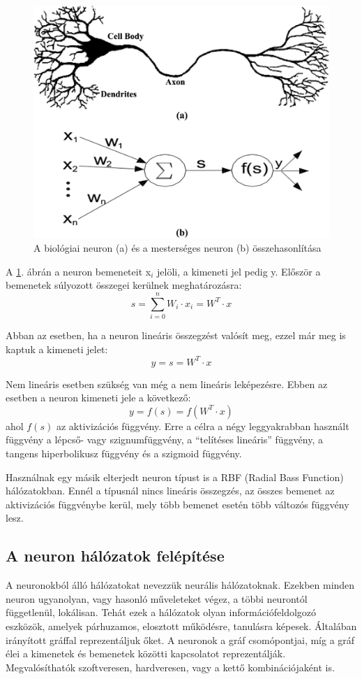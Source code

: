 \documentclass[a4paper]{article}
\begin{document}
\begin{figure}
  \centering
  \includegraphics[scale=0.6]{artifical_neuron}
  \caption{A biológiai neuron (a) és a mesterséges neuron (b) összehasonlítása}
  \label{artifical_neuron}
\end{figure}

A \ref{artifical_neuron}. ábrán a neuron bemeneteit x${_i}$ jelöli, a kimeneti jel pedig y. Először a bemenetek súlyozott összegei kerülnek meghatározásra: $${s=\sum_{i=0}^{n} W_i \cdot x_i = W^T \cdot x}$$

Abban az esetben, ha a neuron lineáris összegzést valósít meg, ezzel már meg is kaptuk a kimeneti jelet:$${y = s = W^T \cdot x}$$

Nem lineáris esetben szükség van még a nem lineáris leképezésre. Ebben az esetben a neuron kimeneti jele a következő:$${y = f(s) = f(W^T \cdot x)}$$ ahol ${f(s)}$ az aktivizációs függvény. Erre a célra a négy leggyakrabban használt függvény a lépcső- vagy szignumfüggvény, a ``telítéses lineáris'' függvény, a tangens hiperbolikusz függvény és a szigmoid függvény.

Használnak egy másik elterjedt neuron típust is a RBF (Radial Bass Function) hálózatokban. Ennél a típusnál nincs lineáris összegzés,  az összes bemenet az aktivizációs függvénybe kerül, mely több bemenet esetén több változós függvény lesz.

\subsection{A neuron hálózatok felépítése}
A neuronokból álló hálózatokat nevezzük neurális hálózatoknak. Ezekben minden neuron ugyanolyan, vagy hasonló műveleteket végez, a többi neurontól függetlenül, lokálisan. Tehát ezek a hálózatok olyan információfeldolgozó eszközök, amelyek párhuzamos, elosztott működésre, tanulásra képesek. Általában irányított gráffal reprezentáljuk őket. A neuronok a gráf csomópontjai, míg a gráf élei a kimenetek és bemenetek közötti kapcsolatot reprezentálják. Megvalósíthatók szoftveresen, hardveresen, vagy a kettő kombinációjaként is. 
\end{document}
